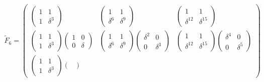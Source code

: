 \begin{multline*}
    \widetilde{F}_6
    =
    \begin{pmatrix}
        \begin{pmatrix}
            1 & 1        \\
            1 & \delta^3
        \end{pmatrix}
        &
        \begin{pmatrix}
            1        & 1        \\
            \delta^6 & \delta^9
        \end{pmatrix}
        &
        \begin{pmatrix}
            1           & 1           \\
            \delta^{12} & \delta^{15}
        \end{pmatrix}
        \\
        \begin{pmatrix}
            1 & 1        \\
            1 & \delta^3
        \end{pmatrix}
        \begin{pmatrix}
            1 & 0      \\
            0 & \delta
        \end{pmatrix}
        &
        \begin{pmatrix}
            1        & 1        \\
            \delta^6 & \delta^9
        \end{pmatrix}
        \begin{pmatrix}
            \delta^2 & 0        \\
            0        & \delta^3
        \end{pmatrix}
        &
        \begin{pmatrix}
            1           & 1           \\
            \delta^{12} & \delta^{15}
        \end{pmatrix}
        \begin{pmatrix}
            \delta^4 & 0        \\
            0        & \delta^5
        \end{pmatrix}
        \\
        \begin{pmatrix}
            1 & 1        \\
            1 & \delta^3
        \end{pmatrix}
        \begin{pmatrix}

\end{pmatrix}
\end{pmatrix}
\end{multline*}
